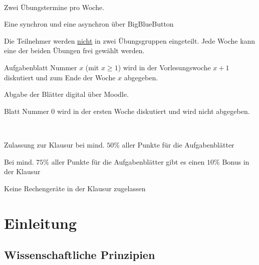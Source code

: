 \begin{bem}[Übung]{\ } 
	\begin{enuma} 
		\item Zwei Übungstermine pro Woche.
		\item Eine synchron und eine asynchron über BigBlueButton
		\item Die Teilnehmer werden \underline{nicht} in zwei Übungsgruppen eingeteilt. Jede Woche kann eine der beiden Übungen frei gewählt werden. 
		\item Aufgabenblatt Nummer $x$ (mit $x \ge 1$) wird in der Vorlesungswoche $x+1$ diskutiert und zum Ende der Woche $x$ abgegeben. 
		\item Abgabe der Blätter digital über Moodle. 
		\item Blatt Nummer $0$ wird in der ersten Woche diskutiert und wird nicht abgegeben. 
	\end{enuma} 
\end{bem} 


\begin{bem}[Prüfung]{ \ } 
	\begin{enuma} 
		\item Zulassung zur Klausur bei mind. $50\%$ aller Punkte für die Aufgabenblätter 
		\item Bei mind. $75\%$ aller Punkte für die Aufgabenblätter gibt es einen $10\%$ Bonus in der Klausur
		\item Keine Rechengeräte in der Klausur zugelassen
	\end{enuma} 
\end{bem} 

\chapter*{Einleitung}

\section{Wissenschaftliche Prinzipien}

